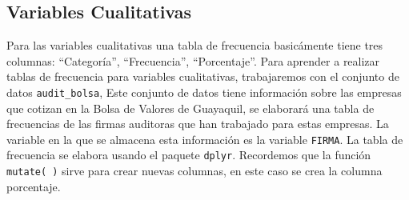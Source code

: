 \documentclass[]{book}
\newenvironment{Shaded}{\begin{snugshade}}{\end{snugshade}}
\newcommand{\DataTypeTok}[1]{\textcolor[rgb]{0.13,0.29,0.53}{#1}}
\newcommand{\DecValTok}[1]{\textcolor[rgb]{0.00,0.00,0.81}{#1}}
\newcommand{\KeywordTok}[1]{\textcolor[rgb]{0.13,0.29,0.53}{\textbf{#1}}}
\newcommand{\NormalTok}[1]{#1}
\newcommand{\OperatorTok}[1]{\textcolor[rgb]{0.81,0.36,0.00}{\textbf{#1}}}
\newcommand{\OtherTok}[1]{\textcolor[rgb]{0.56,0.35,0.01}{#1}}
\newcommand{\StringTok}[1]{\textcolor[rgb]{0.31,0.60,0.02}{#1}}
\begin{document}
\hypertarget{variables-cualitativas}{%
\subsection{Variables Cualitativas}\label{variables-cualitativas}}

Para las variables cualitativas una tabla de frecuencia basicámente tiene tres columnas: ``Categoría'', ``Frecuencia'', ``Porcentaje''. Para aprender a realizar tablas de frecuencia para variables cualitativas, trabajaremos con el conjunto de datos \texttt{audit\_bolsa}, Este conjunto de datos tiene información sobre las empresas que cotizan en la Bolsa de Valores de Guayaquil, se elaborará una tabla de frecuencias de las firmas auditoras que han trabajado para estas empresas. La variable en la que se almacena esta información es la variable \texttt{FIRMA}. La tabla de frecuencia se elabora usando el paquete \texttt{dplyr}. Recordemos que la función \texttt{mutate(\ )} sirve para crear nuevas columnas, en este caso se crea la columna porcentaje.

\begin{Shaded}
\end{Shaded}
\end{document}

